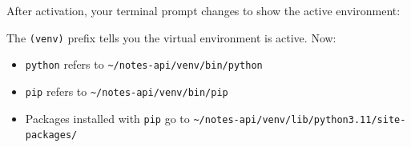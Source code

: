 \begin{codebox}[short]

\begin{Shaded}
\begin{Highlighting}[]
 


\end{Highlighting}
\end{Shaded}

\end{codebox}

\noindent{}After activation, your terminal prompt changes to show the active environment:

\begin{codebox}[short]

\begin{Shaded}
\begin{Highlighting}[]
\KeywordTok{(}\KeywordTok{)} 
\end{Highlighting}
\end{Shaded}

\end{codebox}

\noindent{}The \texttt{(venv)} prefix tells you the virtual environment is active. Now:

\begin{itemize}
\tightlist
\item
  \texttt{python} refers to \texttt{\textasciitilde{}/}\allowbreak{}\texttt{notes-}\allowbreak{}\texttt{api/}\allowbreak{}\texttt{venv/}\allowbreak{}\texttt{bin/}\allowbreak{}\texttt{python}
\item
  \texttt{pip} refers to \texttt{\textasciitilde{}/}\allowbreak{}\texttt{notes-}\allowbreak{}\texttt{api/}\allowbreak{}\texttt{venv/}\allowbreak{}\texttt{bin/}\allowbreak{}\texttt{pip}
\item
  Packages installed with \texttt{pip} go to \texttt{\textasciitilde{}/}\allowbreak{}\texttt{notes-}\allowbreak{}\texttt{api/}\allowbreak{}\texttt{venv/}\allowbreak{}\texttt{lib/}\allowbreak{}\texttt{python3.}\allowbreak{}\texttt{11/}\allowbreak{}\texttt{site-}\allowbreak{}\texttt{packages/}
\end{itemize}

